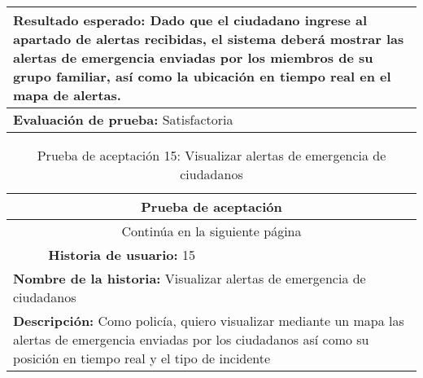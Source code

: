 \begin{longtable}{|p{6.7cm}|p{6.7cm}|}
    \hline
    \multicolumn{2}{|p{13.4cm}|}{\textbf{Resultado esperado:} Dado que el ciudadano ingrese al apartado de alertas recibidas, el sistema deberá mostrar las alertas de emergencia enviadas por los miembros de su grupo familiar, así como la ubicación en tiempo real en el mapa de alertas.} \\
    \hline
    \multicolumn{2}{|p{13.4cm}|}{\textbf{Evaluación de prueba:} Satisfactoria}                                                                                                                                                                                                                 \\
    \hline
\end{longtable}


\begin{longtable}{|p{6.7cm}|p{6.7cm}|}
    \caption{Prueba de aceptación 15: Visualizar alertas de emergencia de ciudadanos} \label{tab:prueba-15}                                                                                                                                              \\
    \hline
    \multicolumn{2}{|c|}{\textbf{Prueba de aceptación}}                                                                                                                                                                                                  \\
    \hline
    \endfirsthead
    \hline
    \endhead
    \hline
    \multicolumn{2}{|c|}{{Continúa en la siguiente página}}                                                                                                                                                                                              \\
    \hline
    \endfoot
    \hline
    \endlastfoot
    \multicolumn{1}{|p{6.7cm}|}{\textbf{Número} 15} & \multicolumn{1}{|p{6.7cm}|}{\textbf{Historia de usuario:} 15}                                                                                                                                      \\
    \hline
    \multicolumn{2}{|p{13.4cm}|}{\textbf{Nombre de la historia:} Visualizar alertas de emergencia de ciudadanos}                                                                                                                                         \\
    \hline
    \multicolumn{2}{|p{13.4cm}|}{\textbf{Descripción:} Como policía, quiero visualizar mediante un mapa las alertas de emergencia enviadas por los ciudadanos así como su posición en tiempo real y el tipo de incidente}                                \\

\end{longtable}
